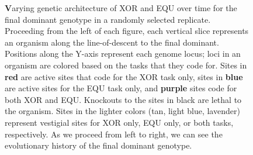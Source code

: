 \documentclass[PhD]{msu-thesis}
\begin{document}
\begin{figure}[!h]
\setlength{\fboxsep}{0pt}%
\setlength{\fboxrule}{0pt}%
\caption{{\textbf Varying genetic architecture of XOR and EQU over time} for the final dominant genotype in a randomly selected replicate. Proceeding from the left of each figure, each vertical slice represents an organism along the line-of-descent to the final dominant.
Positions along the Y-axis represent each genome locus; loci in an organism are colored based on the tasks that they code for. Sites in \textbf{red} are active sites that code for the XOR task only, sites in \textbf{blue} are active sites for the EQU task only, and \textbf{purple} sites code for both XOR and EQU. Knockouts to the sites in black are lethal to the organism. Sites in the lighter colors (tan, light blue, lavender) represent vestigial sites for XOR only, EQU only, or both tasks, respectively. As we proceed from left to right, we can see the evolutionary history of the final dominant genotype.}
\label{fig:lineage}
\end{figure}
\end{document}
